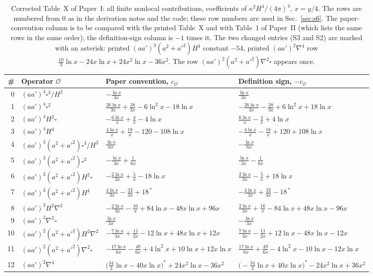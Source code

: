 \documentclass[aps,prd,onecolumn,10pt,nofootinbib,floatfix]{revtex4-2}
\newcommand{\PI}{Paper~I}
\newcommand{\PII}{Paper~II}
\begin{document}
\begin{table}[tb]
\caption{Corrected Table~X of \PI: all finite nonlocal contributions, coefficients of $\kappa^2H^4/(4\pi)^4$, $x=y/4$. The rows are numbered from 0 as in the derivation notes and the code; these row numbers are used in Sec.~\ref{sec:s6}. The paper-convention column is to be compared with the printed Table~X and with Table~1 of \PII{} (which lists the same rows in the same order); the definition-sign column is $-1$ times it. The two changed entries (S3 and S2) are marked with an asterisk: printed $(aa')^3(a^2+a'^2)H^4$ constant $-54$, printed $(aa')^2\nabla^4$ row $\frac{10}{3}\ln x-24x\ln x+24x^2\ln x-36x^2$. The row $(aa')^2(a^2+a'^2)\nabla^2\square$ appears once.}
\label{tab:s5:TX}
\renewcommand{\arraystretch}{1.5}
\begin{ruledtabular}
\begin{tabular}{rlll}
\# & Operator $\mathcal O$ & Paper convention, $c_{\mathcal O}$ & Definition sign, $-c_{\mathcal O}$\\
\hline
0 & $(aa')^4\square^3/H^2$ & $-\frac{\ln x}{3x}$ & $\frac{\ln x}{3x}$\\
1 & $(aa')^4\square^2$ & $\frac{26\ln x}{3x}+\frac{38}{3x}-6\ln^2x-18\ln x$ & $-\frac{26\ln x}{3x}-\frac{38}{3x}+6\ln^2x+18\ln x$\\
2 & $(aa')^4H^2\square$ & $-\frac{6\ln x}{x}+\frac4x-4\ln x$ & $\frac{6\ln x}{x}-\frac4x+4\ln x$\\
3 & $(aa')^4H^4$ & $\frac{4\ln x}{x}+\frac{18}{x}-120-108\ln x$ & $-\frac{4\ln x}{x}-\frac{18}{x}+120+108\ln x$\\
4 & $(aa')^3(a^2+a'^2)\square^3/H^2$ & $\frac{\ln x}{6x}$ & $-\frac{\ln x}{6x}$\\
5 & $(aa')^3(a^2+a'^2)\square^2$ & $-\frac{\ln x}{3x}+\frac1{6x}$ & $\frac{\ln x}{3x}-\frac1{6x}$\\
6 & $(aa')^3(a^2+a'^2)H^2\square$ & $-\frac{2\ln x}{3x}+\frac5x-18\ln x$ & $\frac{2\ln x}{3x}-\frac5x+18\ln x$\\
7 & $(aa')^3(a^2+a'^2)H^4$ & $\frac{4\ln x}{3x}-\frac{32}{3x}+18^{\,*}$ & $-\frac{4\ln x}{3x}+\frac{32}{3x}-18^{\,*}$\\
8 & $(aa')^3H^2\nabla^2$ & $-\frac{2\ln x}{3x}-\frac{16}{x}+84\ln x-48x\ln x+96x$ & $\frac{2\ln x}{3x}+\frac{16}{x}-84\ln x+48x\ln x-96x$\\
9 & $(aa')^3\nabla^2\square$ & $\frac{\ln x}{3x}$ & $-\frac{\ln x}{3x}$\\
10 & $(aa')^2(a^2+a'^2)H^2\nabla^2$ & $-\frac{7\ln x}{3x}+\frac{11}{2x}-12\ln x+48x\ln x+12x$ & $\frac{7\ln x}{3x}-\frac{11}{2x}+12\ln x-48x\ln x-12x$\\
11 & $(aa')^2(a^2+a'^2)\nabla^2\square$ & $-\frac{17\ln x}{6x}-\frac{49}{6x}+4\ln^2x+10\ln x+12x\ln x$ & $\frac{17\ln x}{6x}+\frac{49}{6x}-4\ln^2x-10\ln x-12x\ln x$\\
12 & $(aa')^2\nabla^4$ & $\big(\frac{34}{3}\ln x-40x\ln x\big)^{*}+24x^2\ln x-36x^2$ & $\big(-\frac{34}{3}\ln x+40x\ln x\big)^{*}-24x^2\ln x+36x^2$\\
\end{tabular}
\end{ruledtabular}
\end{table}
\end{document}
